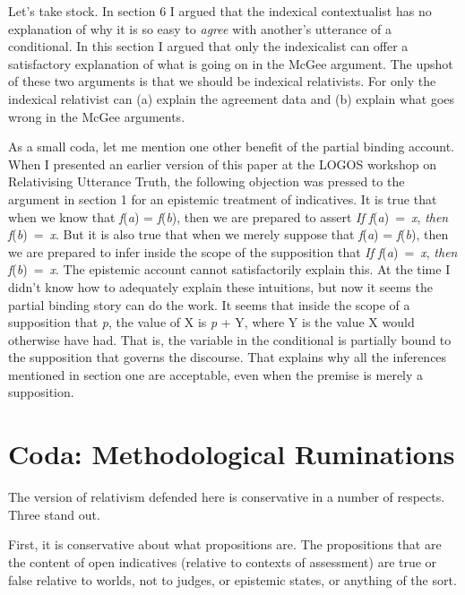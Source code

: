 \documentclass[
  11pt,
  letterpaper,
  DIV=11,
  numbers=noendperiod,
  twoside]{scrartcl}
\begin{document}
Let's take stock. In section 6 I argued that the indexical contextualist
has no explanation of why it is so easy to \emph{agree} with another's
utterance of a conditional. In this section I argued that only the
indexicalist can offer a satisfactory explanation of what is going on in
the McGee argument. The upshot of these two arguments is that we should
be indexical relativists. For only the indexical relativist can (a)
explain the agreement data and (b) explain what goes wrong in the McGee
arguments.

As a small coda, let me mention one other benefit of the partial binding
account. When I presented an earlier version of this paper at the LOGOS
workshop on Relativising Utterance Truth, the following objection was
pressed to the argument in section 1 for an epistemic treatment of
indicatives. It is true that when we know that \emph{f}(\emph{a}) =
\emph{f}(\emph{b}), then we are prepared to assert \emph{If
f}(\emph{a})~=~\emph{x}, \emph{then f}(\emph{b})~=~\emph{x}. But it is
also true that when we merely suppose that \emph{f}(\emph{a}) =
\emph{f}(\emph{b}), then we are prepared to infer inside the scope of
the supposition that \emph{If f}(\emph{a})~=~\emph{x}, \emph{then
f}(\emph{b})~=~\emph{x}. The epistemic account cannot satisfactorily
explain this. At the time I didn't know how to adequately explain these
intuitions, but now it seems the partial binding story can do the work.
It seems that inside the scope of a supposition that \emph{p}, the value
of X is \emph{p} + Y, where Y is the value X would otherwise have had.
That is, the variable in the conditional is partially bound to the
supposition that governs the discourse. That explains why all the
inferences mentioned in section one are acceptable, even when the
premise is merely a supposition.

\section*{Coda: Methodological
Ruminations}\label{coda-methodological-ruminations}

The version of relativism defended here is conservative in a number of
respects. Three stand out.

First, it is conservative about what propositions are. The propositions
that are the content of open indicatives (relative to contexts of
assessment) are true or false relative to worlds, not to judges, or
epistemic states, or anything of the sort.
\end{document}
